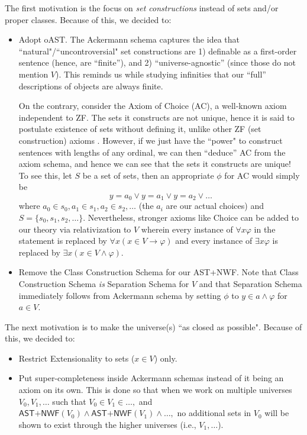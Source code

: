 \documentclass{article}
\begin{document}
The first motivation is the focus on \textit{set constructions} instead of sets and/or proper classes. Because of this, we decided to:
\begin{itemize}
\item Adopt \textsf{oAST}. The Ackermann schema captures the idea that ``natural"/``uncontroversial" set constructions are 1) definable as a first-order sentence (hence, are ``finite''), and 2) ``universe-agnostic'' (since those do not mention $V$). This reminds us while studying infinities that our ``full'' descriptions of objects are always finite.

On the contrary, consider the Axiom of Choice (AC), a well-known axiom independent to \textsf{ZF}. The sets it constructs are not unique, hence it is said to postulate existence of sets without defining it, unlike other \textsf{ZF} (set construction) axioms \cite[Chapter 5]{jech}. However, if we just have the ``power" to construct sentences with lengths of any ordinal, we can then ``deduce'' AC from the axiom schema, and hence we can see that the sets it constructs are unique! To see this, let $S$ be a set of sets, then an appropriate $\phi$ for AC would simply be $$y = a_0 \vee y = a_1 \vee y = a_2 \vee \ldots$$ where $a_0 \in s_0, a_1 \in s_1, a_2 \in s_2, \ldots$ (the $a_i$ are our actual choices) and $S=\{s_0, s_1, s_2, \ldots\}$. Nevertheless, stronger axioms like Choice can be added to our theory via relativization to $V$ wherein every instance of $\forall x \varphi$ in the statement is replaced by $\forall x (x \in V \rightarrow \varphi)$ and every instance of $\exists x \varphi$ is replaced by $\exists x (x \in V \wedge \varphi)$.
\item Remove the Class Construction Schema for our \textsf{AST+NWF}. Note that Class Construction Schema \textit{is} Separation Schema for $V$ and that Separation Schema immediately follows from Ackermann schema by setting $\phi$ to $y \in a \wedge \varphi$ for $a\in V$.
\end{itemize}

The next motivation is to make the universe(s) ``as closed as possible". Because of this, we decided to:
\begin{itemize}
\item Restrict Extensionality to sets ($x \in V$) only.
\item Put super-completeness inside Ackermann schemas instead of it being an axiom on its own. This is done so that when we work on multiple universes $V_0, V_1, \ldots$ such that $V_0 \in V_1 \in \ldots,$ and $\textsf{AST+NWF}(V_0) \wedge \textsf{AST+NWF}(V_1) \wedge\ldots,$ no additional sets in $V_0$ will be shown to exist through the higher universes (i.e., $V_1, \ldots$).
\end{itemize}
\end{document}
